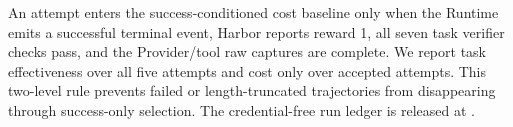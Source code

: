 An attempt enters the success-conditioned cost baseline only when the
Runtime emits a successful terminal event, Harbor reports reward 1,
all seven task verifier checks pass, and the Provider/tool raw captures
are complete. We report task effectiveness over all five attempts and
cost only over accepted attempts. This two-level rule prevents failed
or length-truncated trajectories from disappearing through
success-only selection. The credential-free run ledger is released at
.
